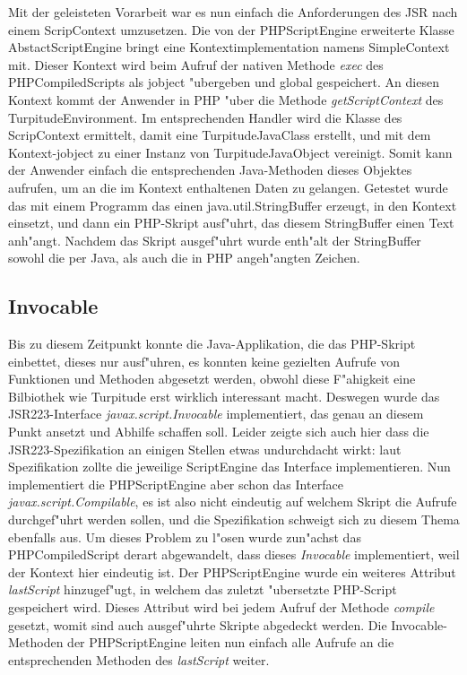 Mit der geleisteten Vorarbeit war es nun einfach die Anforderungen des JSR nach einem ScripContext umzusetzen. Die von der PHPScriptEngine erweiterte Klasse
AbstactScriptEngine bringt eine Kontextimplementation namens SimpleContext mit. Dieser Kontext wird beim Aufruf der nativen Methode \emph{exec} des PHPCompiledScripts
als jobject "ubergeben und global gespeichert. An diesen Kontext kommt der Anwender in PHP "uber die Methode \emph{getScriptContext} des TurpitudeEnvironment. Im 
entsprechenden Handler wird die Klasse des ScripContext ermittelt, damit eine TurpitudeJavaClass erstellt, und mit dem Kontext-jobject zu einer Instanz von
TurpitudeJavaObject vereinigt. Somit kann der Anwender einfach die entsprechenden Java-Methoden dieses Objektes aufrufen, um an die im Kontext enthaltenen Daten zu
gelangen. Getestet wurde das mit einem Programm das einen java.util.StringBuffer erzeugt, in den Kontext einsetzt, und dann ein PHP-Skript ausf"uhrt, das diesem
StringBuffer einen Text anh"angt. Nachdem das Skript ausgef"uhrt wurde enth"alt der StringBuffer sowohl die per Java, als auch die in PHP angeh"angten Zeichen.

\subsection{Invocable}
\label{sec:chap1:impl:10}

Bis zu diesem Zeitpunkt konnte die Java-Applikation, die das PHP-Skript einbettet, dieses nur ausf"uhren, es konnten keine gezielten Aufrufe von Funktionen und Methoden
abgesetzt werden, obwohl diese F"ahigkeit eine Bilbiothek wie Turpitude erst wirklich interessant macht. Deswegen wurde das JSR223-Interface \emph{javax.script.Invocable}
implementiert, das genau an diesem Punkt ansetzt und Abhilfe schaffen soll. Leider zeigte sich auch hier dass die JSR223-Spezifikation an einigen Stellen
etwas undurchdacht wirkt: laut Spezifikation zollte die jeweilige ScriptEngine das Interface implementieren. Nun implementiert die PHPScriptEngine aber schon
das Interface \emph{javax.script.Compilable}, es ist also nicht eindeutig auf welchem Skript die Aufrufe durchgef"uhrt werden sollen, und die Spezifikation schweigt
sich zu diesem Thema ebenfalls aus. Um dieses Problem zu l"osen wurde zun"achst das PHPCompiledScript derart abgewandelt, dass dieses \emph{Invocable} implementiert,
weil der Kontext hier eindeutig ist. Der PHPScriptEngine wurde ein weiteres Attribut \emph{lastScript} hinzugef"ugt, in welchem das zuletzt "ubersetzte 
PHP-Script gespeichert wird. Dieses Attribut wird bei jedem Aufruf der Methode \emph{compile} gesetzt, womit sind auch ausgef"uhrte Skripte abgedeckt werden.
Die Invocable-Methoden der PHPScriptEngine leiten nun einfach alle Aufrufe an die entsprechenden Methoden des \emph{lastScript} weiter.

